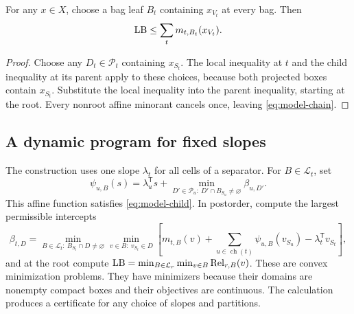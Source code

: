 \begin{proposition}\label{prop:model-chain}
For any $x\in X$, choose a bag leaf $B_t$ containing $x_{V_t}$ at every
bag. Then
\begin{equation}\label{eq:model-chain}
 \mathrm{LB}\le\sum_t m_{t,B_t}(x_{V_t}).
\end{equation}
\end{proposition}
\begin{proof}
Choose any $D_t\in\mathcal P_t$ containing $x_{S_t}$. The local inequality
at $t$ and the child inequality at its parent apply to these choices,
because both projected boxes contain $x_{S_t}$. Substitute the local
inequality into the parent inequality, starting at the root. Every
nonroot affine minorant cancels once, leaving \eqref{eq:model-chain}.
\end{proof}

\subsection{A dynamic program for fixed slopes}
The construction uses one slope $\lambda_t$ for all cells of a separator.
For $B\in\mathcal L_t$, set
\begin{equation}\label{eq:model-fixed-child}
 \psi_{u,B}(s)=\lambda_u^{\mathsf T}s+
 \min_{D'\in\mathcal P_u:\ D'\cap B_{S_u}\ne\varnothing}\beta_{u,D'}.
\end{equation}
This affine function satisfies \eqref{eq:model-child}. In postorder,
compute the largest permissible intercepts
\begin{equation}\label{eq:model-intercept}
 \beta_{t,D}=\min_{B\in\mathcal L_t:\ B_{S_t}\cap D\ne\varnothing}
 \min_{v\in B:\ v_{S_t}\in D}
 \left[m_{t,B}(v)+\sum_{u\in\operatorname{ch}(t)}\psi_{u,B}(v_{S_u})
       -\lambda_t^{\mathsf T}v_{S_t}\right],
\end{equation}
and at the root compute $\mathrm{LB}=\min_{B\in\mathcal L_r}
\min_{v\in B}\operatorname{Rel}_{r,B}(v)$. These are convex minimization
problems. They have minimizers because their domains are nonempty compact
boxes and their objectives are continuous. The calculation produces a
certificate for any choice of slopes and partitions.

